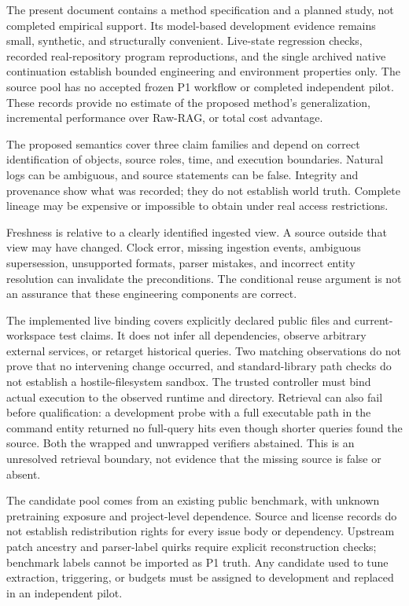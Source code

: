 \begin{sloppypar}

The present document contains a method specification and a planned study, not completed empirical support. Its model-based development evidence remains small, synthetic, and structurally convenient. Live-state regression checks, recorded real-repository program reproductions, and the single archived native continuation establish bounded engineering and environment properties only. The source pool has no accepted frozen P1 workflow or completed independent pilot. These records provide no estimate of the proposed method's generalization, incremental performance over Raw-RAG, or total cost advantage.

\end{sloppypar}

The proposed semantics cover three claim families and depend on correct
identification of objects, source roles, time, and execution boundaries.
Natural logs can be ambiguous, and source statements can be false.
Integrity and provenance show what was recorded; they do not establish
world truth. Complete lineage may be expensive or impossible to obtain
under real access restrictions.

Freshness is relative to a clearly identified ingested view. A source
outside that view may have changed. Clock error, missing ingestion
events, ambiguous supersession, unsupported formats, parser mistakes,
and incorrect entity resolution can invalidate the preconditions. The
conditional reuse argument is not an assurance that these engineering
components are correct.

The implemented live binding covers explicitly declared public files and
current-workspace test claims. It does not infer all dependencies,
observe arbitrary external services, or retarget historical queries. Two
matching observations do not prove that no intervening change occurred,
and standard-library path checks do not establish a hostile-filesystem
sandbox. The trusted controller must bind actual execution to the
observed runtime and directory. Retrieval can also fail before
qualification: a development probe with a full executable path in the
command entity returned no full-query hits even though shorter queries
found the source. Both the wrapped and unwrapped verifiers abstained.
This is an unresolved retrieval boundary, not evidence that the missing
source is false or absent.

The candidate pool comes from an existing public benchmark, with unknown
pretraining exposure and project-level dependence. Source and license
records do not establish redistribution rights for every issue body or
dependency. Upstream patch ancestry and parser-label quirks require
explicit reconstruction checks; benchmark labels cannot be imported as
P1 truth. Any candidate used to tune extraction, triggering, or budgets
must be assigned to development and replaced in an independent pilot.

